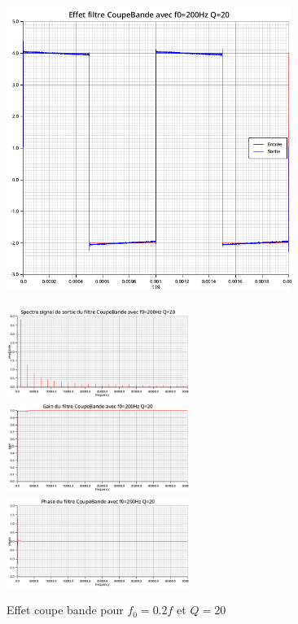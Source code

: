 \documentclass{article}
\begin{document}
\begin{figure}[H]
  \begin{minipage}{0.6\textwidth}
      \centering
      \includegraphics[width=25em]{images/creneau/rejecteur/q=20/0.2/signals.png}
  \end{minipage}
  \begin{minipage}{0.3\textwidth}
      \centering
      \includegraphics[width=16em]{images/creneau/rejecteur/q=20/0.2/fft_out.png}
      \vfill
      \includegraphics[width=16em]{images/creneau/rejecteur/q=20/0.2/gain.png}
      \vfill
      \includegraphics[width=16em]{images/creneau/rejecteur/q=20/0.2/phase.png}
  \end{minipage}
  \caption{Effet coupe bande pour $f_0=0.2f$ et $Q=20$}
\end{figure}
\end{document}
